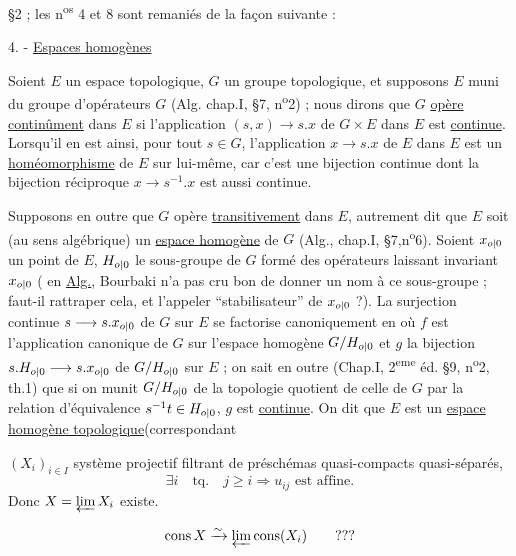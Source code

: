 §2 ; les n\textsuperscript{os} 4 et 8 sont remaniés de la façon suivante :

4. - \uline{Espaces homogènes}

Soient $E$ un espace topologique, $G$ un groupe topologique, et supposons $E$ muni du groupe d'opérateurs $G$ (Alg. chap.I, §7, n\textsuperscript{o}2) ; nous dirons que $G$ \uline{opère continûment} dans $E$ si l'application $(s,x)\longrightarrow s.x$ de $G\times E$ dans $E$ est \uline{continue}. Lorsqu'il en est ainsi, pour tout $s\in G$, l'application $x\longrightarrow s.x$ de $E$ dans $E$ est un \uline{homéomorphisme} de $E$ sur lui-même, car c'est une bijection continue dont la bijection réciproque $x\longrightarrow s^{-1}.x$ est aussi continue.

Supposons en outre que $G$ opère \uline{transitivement} dans $E$, autrement dit que $E$ soit (au sens algébrique) un \uline{espace homogène} de $G$ (Alg., chap.I, §7,n\textsuperscript{o}6). Soient $x_{o|0}$ un point de $E$, $H_{o|0}$ le sous-groupe de $G$ formé des opérateurs laissant invariant $x_{o|0}$ ( en \uline{Alg.}, Bourbaki n'a pas cru bon de donner un nom à ce sous-groupe ; faut-il rattraper cela, et l'appeler ``stabilisateur'' de $x_{o|0}$ ?). La surjection continue $s\longrightarrow s.x_{o|0}$ de $G$ sur $E$ se factorise canoniquement en
où $f$ est l'application canonique de $G$ sur l'espace homogène $G/H_{o|0}$ et $g$ la bijection $s.H_{o|0}\longrightarrow s.x_{o|0}$ de $G/H_{o|0}$ sur $E$ ; on sait en outre (Chap.I, 2\textsuperscript{eme} éd. §9, n\textsuperscript{o}2, th.1) que si on munit $G/H_{o|0}$ de la topologie quotient de celle de $G$ par la relation d'équivalence $s^{-1}t\in H_{o|0}$, $g$ est \uline{continue}. On dit que $E$ est un \uline{espace homogène topologique}(correspondant

$(X_i)_{i\in I}$ système projectif filtrant de préschémas quasi-compacts quasi-séparés,
\[
\exists i\quad\text{tq.}\quad j\geq i\Longrightarrow u_{ij}\text{ est affine}.
\]
Donc $X=\varprojlim X_i$ existe.

 
\[
\operatorname{cons}X\xrightarrow{\sim}\varprojlim\operatorname{cons}(X_i)\qquad ???
\]

